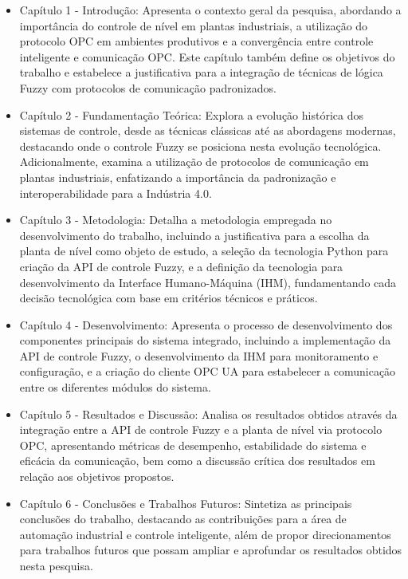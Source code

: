 \begin{itemize}
\item Capítulo 1 - Introdução: Apresenta o contexto geral da pesquisa, abordando a importância do controle de nível em plantas industriais, a utilização do protocolo OPC em ambientes produtivos e a convergência entre controle inteligente e comunicação OPC. Este capítulo também define os objetivos do trabalho e estabelece a justificativa para a integração de técnicas de lógica Fuzzy com protocolos de comunicação padronizados.
\item Capítulo 2 - Fundamentação Teórica: Explora a evolução histórica dos sistemas de controle, desde as técnicas clássicas até as abordagens modernas, destacando onde o controle Fuzzy se posiciona nesta evolução tecnológica. Adicionalmente, examina a utilização de protocolos de comunicação em plantas industriais, enfatizando a importância da padronização e interoperabilidade para a Indústria 4.0.
\item Capítulo 3 - Metodologia: Detalha a metodologia empregada no desenvolvimento do trabalho, incluindo a justificativa para a escolha da planta de nível como objeto de estudo, a seleção da tecnologia Python para criação da API de controle Fuzzy, e a definição da tecnologia para desenvolvimento da Interface Humano-Máquina (IHM), fundamentando cada decisão tecnológica com base em critérios técnicos e práticos.
\item Capítulo 4 - Desenvolvimento: Apresenta o processo de desenvolvimento dos componentes principais do sistema integrado, incluindo a implementação da API de controle Fuzzy, o desenvolvimento da IHM para monitoramento e configuração, e a criação do cliente OPC UA para estabelecer a comunicação entre os diferentes módulos do sistema.
\item Capítulo 5 - Resultados e Discussão: Analisa os resultados obtidos através da integração entre a API de controle Fuzzy e a planta de nível via protocolo OPC, apresentando métricas de desempenho, estabilidade do sistema e eficácia da comunicação, bem como a discussão crítica dos resultados em relação aos objetivos propostos.
\item Capítulo 6 - Conclusões e Trabalhos Futuros: Sintetiza as principais conclusões do trabalho, destacando as contribuições para a área de automação industrial e controle inteligente, além de propor direcionamentos para trabalhos futuros que possam ampliar e aprofundar os resultados obtidos nesta pesquisa.
\end{itemize}